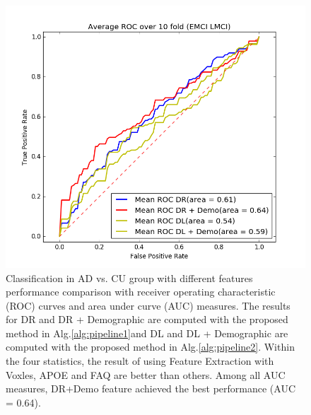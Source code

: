 \begin{figure}[h]
	\centering
	\includegraphics[width=\linewidth]{figures/EMCI_LMCI}
	\caption[ROC for EMCI vs. LMCI.]{Classification in AD vs. CU group with different features performance comparison with receiver operating characteristic (ROC) curves and area under curve (AUC) measures. The results for DR and DR + Demographic are computed with the proposed method in Alg.\ref{alg:pipeline1}and DL and DL + Demographic are computed with the proposed method in Alg.\ref{alg:pipeline2}. Within the four statistics, the result of using Feature Extraction with Voxles, APOE and FAQ are better than others. Among all AUC measures, DR+Demo feature achieved the best performance (AUC = 0.64).}
	\label{fig:emcilmci}
\end{figure}
